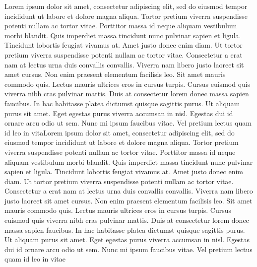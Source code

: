 Lorem ipsum dolor sit amet, consectetur adipiscing elit, sed do eiusmod
tempor incididunt ut labore et dolore magna aliqua. Tortor pretium
viverra suspendisse potenti nullam ac tortor vitae. Porttitor massa id
neque aliquam vestibulum morbi blandit. Quis imperdiet massa tincidunt
nunc pulvinar sapien et ligula. Tincidunt lobortis feugiat vivamus
at. Amet justo donec enim diam. Ut tortor pretium viverra suspendisse
potenti nullam ac tortor vitae. Consectetur a erat nam at lectus urna
duis convallis convallis. Viverra nam libero justo laoreet sit amet
cursus. Non enim praesent elementum facilisis leo. Sit amet mauris
commodo quis. Lectus mauris ultrices eros in cursus turpis. Cursus euismod
quis viverra nibh cras pulvinar mattis. Duis at consectetur lorem donec
massa sapien faucibus. In hac habitasse platea dictumst quisque sagittis
purus. Ut aliquam purus sit amet. Eget egestas purus viverra accumsan
in nisl. Egestas dui id ornare arcu odio ut sem. Nunc mi ipsum faucibus
vitae. Vel pretium lectus quam id leo in vitaLorem ipsum dolor sit amet, consectetur adipiscing elit, sed do eiusmod
tempor incididunt ut labore et dolore magna aliqua. Tortor pretium
viverra suspendisse potenti nullam ac tortor vitae. Porttitor massa id
neque aliquam vestibulum morbi blandit. Quis imperdiet massa tincidunt
nunc pulvinar sapien et ligula. Tincidunt lobortis feugiat vivamus
at. Amet justo donec enim diam. Ut tortor pretium viverra suspendisse
potenti nullam ac tortor vitae. Consectetur a erat nam at lectus urna
duis convallis convallis. Viverra nam libero justo laoreet sit amet
cursus. Non enim praesent elementum facilisis leo. Sit amet mauris
commodo quis. Lectus mauris ultrices eros in cursus turpis. Cursus euismod
quis viverra nibh cras pulvinar mattis. Duis at consectetur lorem donec
massa sapien faucibus. In hac habitasse platea dictumst quisque sagittis
purus. Ut aliquam purus sit amet. Eget egestas purus viverra accumsan
in nisl. Egestas dui id ornare arcu odio ut sem. Nunc mi ipsum faucibus
vitae. Vel pretium lectus quam id leo in vitae
